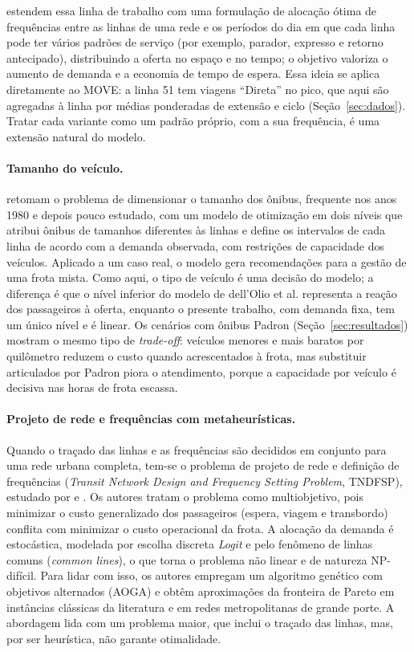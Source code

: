 \documentclass[11pt,a4paper]{article}
\begin{document}
\citet{verbas2013} estendem essa linha de trabalho com uma formulação de
alocação ótima de frequências entre as linhas de uma rede e os períodos do dia
em que cada linha pode ter vários padrões de serviço (por exemplo, parador,
expresso e retorno antecipado), distribuindo a oferta no espaço e no tempo; o
objetivo valoriza o aumento de demanda e a economia de tempo de espera. Essa
ideia se aplica diretamente ao MOVE: a linha 51 tem viagens ``Direta'' no pico,
que aqui são agregadas à linha por médias ponderadas de extensão e ciclo
(Seção~\ref{sec:dados}). Tratar cada variante como um padrão próprio, com a sua
frequência, é uma extensão natural do modelo.

\paragraph{Tamanho do veículo.}
\citet{dellolio2012} retomam o problema de dimensionar o tamanho dos ônibus,
frequente nos anos 1980 e depois pouco estudado, com um modelo de otimização em
dois níveis que atribui ônibus de tamanhos diferentes às linhas e define os
intervalos de cada linha de acordo com a demanda observada, com restrições de
capacidade dos veículos. Aplicado a um caso real, o modelo gera recomendações
para a gestão de uma frota mista. Como aqui, o tipo de veículo é uma decisão do
modelo; a diferença é que o nível inferior do modelo de dell'Olio et al.
representa a reação dos passageiros à oferta, enquanto o presente trabalho, com
demanda fixa, tem um único nível e é linear. Os cenários com ônibus Padron
(Seção~\ref{sec:resultados}) mostram o mesmo tipo de \emph{trade-off}: veículos
menores e mais baratos por quilômetro reduzem o custo quando acrescentados à
frota, mas substituir articulados por Padron piora o atendimento, porque a
capacidade por veículo é decisiva nas horas de frota escassa.

\paragraph{Projeto de rede e frequências com metaheurísticas.}
Quando o traçado das linhas e as frequências são decididos em conjunto para uma
rede urbana completa, tem-se o problema de projeto de rede e definição de
frequências (\emph{Transit Network Design and Frequency Setting Problem},
TNDFSP), estudado por \citet{arbex2014} e \citet{arbex2015}. Os autores tratam
o problema como multiobjetivo, pois minimizar o custo generalizado dos
passageiros (espera, viagem e transbordo) conflita com minimizar o custo
operacional da frota. A alocação da demanda é estocástica, modelada por escolha
discreta \emph{Logit} e pelo fenômeno de linhas comuns (\emph{common lines}), o
que torna o problema não linear e de natureza NP-difícil. Para lidar com isso,
os autores empregam um algoritmo genético com objetivos alternados (AOGA) e
obtêm aproximações da fronteira de Pareto em instâncias clássicas da literatura
e em redes metropolitanas de grande porte. A abordagem lida com um problema
maior, que inclui o traçado das linhas, mas, por ser heurística, não garante
otimalidade.
\end{document}
